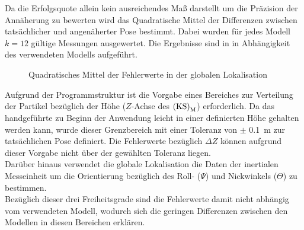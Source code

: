 %

Da die Erfolgsquote allein kein ausreichendes Maß darstellt um die Präzision der Annäherung zu bewerten wird das Quadratische Mittel der Differenzen zwischen tatsächlicher und angenäherter Pose bestimmt. Dabei wurden für jedes Modell $k=12$ gültige Messungen ausgewertet. Die Ergebnisse sind in  in Abhängigkeit des verwendeten Modells aufgeführt.\\



\begin{figure}

\caption{Quadratisches Mittel der Fehlerwerte in der globalen Lokalisation}
\end{figure}

Aufgrund der Programmstruktur ist die Vorgabe eines Bereiches zur Verteilung der Partikel bezüglich der Höhe ($Z$-Achse des ${\mathrm{(KS)}}_{\mathrm{M}}$) erforderlich. Da das handgeführte \kps{} zu Beginn der Anwendung leicht in einer definierten Höhe gehalten werden kann, wurde dieser Grenzbereich mit einer Toleranz von $\pm$ \SI{0,1}{\meter} zur tatsächlichen Pose definiert. Die Fehlerwerte bezüglich $\Delta Z$ können aufgrund dieser Vorgabe nicht über der gewählten Toleranz liegen.\\
Darüber hinaus verwendet die globale Lokalisation die Daten der inertialen Messeinheit um die Orientierung bezüglich des Roll- ($\Psi$) und Nickwinkels ($\Theta$) zu bestimmen.\\
Bezüglich dieser drei Freiheitsgrade sind die Fehlerwerte damit nicht abhängig vom verwendeten Modell, wodurch sich die geringen Differenzen zwischen den Modellen in diesen Bereichen erklären.\\

